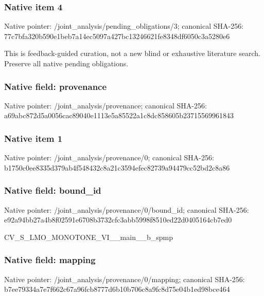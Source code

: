 \documentclass[10pt,a4paper]{article}
\begin{document}
\subsubsection{Native item 4}
Native pointer: /joint\_\allowbreak{}analysis/pending\_\allowbreak{}obligations/3; canonical SHA-256: 77c7bfa320b590e1beb7a14ec5097a427bc13246621fe8348df6050c3a5280e6

\begingroup\raggedright\sloppy This is feedback-guided curation,\allowbreak{} not a new blind or exhaustive literature search. Preserve all native pending obligations.\par\endgroup

\subsubsection{Native field: provenance}
Native pointer: /joint\_\allowbreak{}analysis/provenance; canonical SHA-256: a69abc872d5a0056cac89040e1113e5a85522a1c8dc858605b23715569961843

\subsubsection{Native item 1}
Native pointer: /joint\_\allowbreak{}analysis/provenance/0; canonical SHA-256: b1750c0ee8335d379ab4f548432c8a21c3594efec82739a94479cc52bd2c8a86

\subsubsection{Native field: bound\_\allowbreak{}id}
Native pointer: /joint\_\allowbreak{}analysis/provenance/0/bound\_\allowbreak{}id; canonical SHA-256: e92a94bb27a4b8f02591e6708b3732cfc3abb5998f8510ed22d0405164cb7ed0

\begingroup\raggedright\sloppy CV\_\allowbreak{}S\_\allowbreak{}LMO\_\allowbreak{}MONOTONE\_\allowbreak{}VI\_\allowbreak{}\_\allowbreak{}main\_\allowbreak{}\_\allowbreak{}b\_\allowbreak{}spmp\par\endgroup

\subsubsection{Native field: mapping}
Native pointer: /joint\_\allowbreak{}analysis/provenance/0/mapping; canonical SHA-256: b7ee79334a7e7f662c67a96fcb8777d6b10b706c8a9fc8d75e04b1ed98bce464
\end{document}
